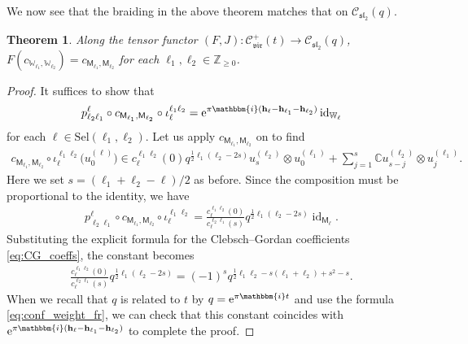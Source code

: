 \documentclass[10pt,a4paper]{amsart}
\numberwithin{equation}{section}
\newtheorem{thm}{Theorem}[section]
\newcommand{\id}{\operatorname{id}}
\newcommand{\bC}{\mathbb{C}}
\newcommand{\bZ}{\mathbb{Z}}
\newcommand{\cC}{\mathcal{C}}
\newcommand{\fsl}{\mathfrak{sl}}
\newcommand{\sfM}{\mathsf{M}}
\newcommand{\bbmi}{\mathbbm{i}}
\newcommand{\QGirrep}[1]{\sfM_{#1}}
\newcommand{\QGirvec}[2]{u^{(#1)}_{#2}}
\newcommand{\CGemb}[3]{\iota_{#1}^{#2 #3}}
\newcommand{\CGproj}[3]{p^{#1}_{#2 #3}}
\newcommand{\CGcoeff}[4]{c_{#1}^{#2 #3}(#4)}
\newcommand{\catQG}{\cC_{\fsl_{2}}}
\newcommand{\catVir}{\cC_{\vir}}
\newcommand{\Sel}{\mathrm{Sel}}
\newcommand{\braid}{c}
\newcommand{\virmod}{\mathbb{W}}
\newcommand{\vir}{\mathfrak{vir}}
\newcommand{\frweight}[1]{\mathbf{h}_{#1}}
\begin{document}
We now see that the braiding in the above theorem matches that on $\catQG(q)$.

\begin{thm}
Along the tensor functor $(F,J) \colon \catVir^{+}(t)\to\catQG(q)$,
$
 F(c_{\virmod_{\ell_{1}},\virmod_{\ell_{2}}})=\braid_{\QGirrep{\ell_{1}},\QGirrep{\ell_{2}}}
$
for each $\ell_{1},\ell_{2}\in\bZ_{\geq 0}$.
\end{thm}
\begin{proof}
It suffices to show that
\[
 \CGproj{\ell}{\ell_{2}}{\ell_{1}}\circ \braid_{\QGirrep{\ell_{1}},\QGirrep{\ell_{2}}}\circ \CGemb{\ell}{\ell_{1}}{\ell_{2}}={\rm e}^{\pi \bbmi (\frweight{\ell}-\frweight{\ell_{1}}-\frweight{\ell_{2}})}\id_{\virmod_{\ell}}
\]
for each $\ell\in\Sel(\ell_{1},\allowbreak\ell_{2})$.
Let us apply $\braid_{\QGirrep{\ell_{1}},\QGirrep{\ell_{2}}}$ on \smash{$\CGemb{\ell}{\ell_{1}}{\ell_{2}}\big(\QGirvec{\ell}{0}\big)$} to find
\begin{gather*}
 \braid_{\QGirrep{\ell_{1}},\QGirrep{\ell_{2}}}\circ \CGemb{\ell}{\ell_{1}}{\ell_{2}}\big(\QGirvec{\ell}{0}\big)
 \in \CGcoeff{\ell}{\ell_{1}}{\ell_{2}}{0}q^{\frac{1}{2}\ell_{1}(\ell_{2}-2s)}\QGirvec{\ell_{2}}{s}\otimes\QGirvec{\ell_{1}}{0}+\sum_{j=1}^{s}\bC \QGirvec{\ell_{2}}{s-j}\otimes\QGirvec{\ell_{1}}{j}.
\end{gather*}
Here we set $s=(\ell_{1}+\ell_{2}-\ell)/2$ as before.
Since the composition \smash{$\CGproj{\ell}{\ell_{2}}{\ell_{1}}\circ \braid_{\QGirrep{\ell_{1}},\QGirrep{\ell_{2}}}\circ \CGemb{\ell}{\ell_{1}}{\ell_{2}}$} must be proportional to the identity,
we have
\begin{align*}
 \CGproj{\ell}{\ell_{2}}{\ell_{1}}\circ \braid_{\QGirrep{\ell_{1}},\QGirrep{\ell_{2}}}\circ \CGemb{\ell}{\ell_{1}}{\ell_{2}}=\frac{\CGcoeff{\ell}{\ell_{1}}{\ell_{2}}{0}}{\CGcoeff{\ell}{\ell_{2}}{\ell_{1}}{s}}q^{\frac{1}{2}\ell_{1}(\ell_{2}-2s)}\id_{\QGirrep{\ell}}.
\end{align*}
Substituting the explicit formula for the Clebsch--Gordan coefficients \eqref{eq:CG_coeffs}, the constant becomes
\begin{gather*}
 \frac{\CGcoeff{\ell}{\ell_{1}}{\ell_{2}}{0}}{\CGcoeff{\ell}{\ell_{2}}{\ell_{1}}{s}}q^{\frac{1}{2}\ell_{1}(\ell_{2}-2s)}
 =(-1)^{s}q^{\frac{1}{2}\ell_{1}\ell_{2}-s(\ell_{1}+\ell_{2})+s^{2}-s}.
\end{gather*}
When we recall that $q$ is related to $t$ by $q={\rm e}^{\pi\bbmi t}$ and use the formula \eqref{eq:conf_weight_fr}, we can check that this constant coincides with ${\rm e}^{\pi\bbmi (\frweight{\ell}-\frweight{\ell_{1}}-\frweight{\ell_{2}})}$ to complete the proof.
\end{proof}
\end{document}
